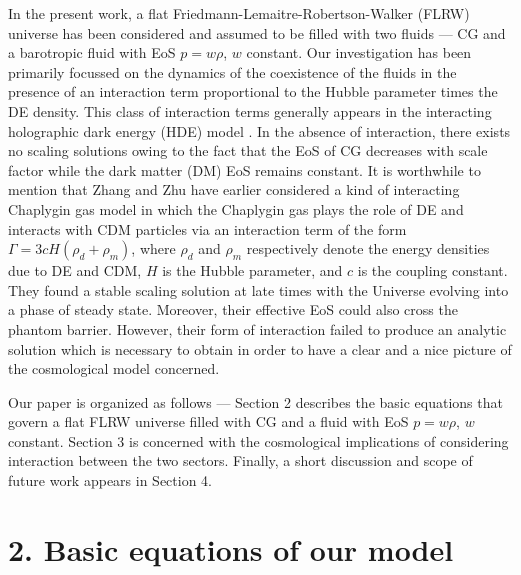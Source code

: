 \documentclass[two-column, nofootinbib]{revtex4-1}
\begin{document}
In the present work, a flat Friedmann-Lemaitre-Robertson-Walker (FLRW) universe has been considered and assumed to be filled with two fluids --- CG and a barotropic fluid with EoS $p=w\rho$, $w$ constant. Our investigation has been primarily focussed on the dynamics of the coexistence of the fluids %
in the presence of an interaction term proportional to the Hubble parameter times the DE density. %
This class of interaction terms generally appears in the interacting holographic dark energy (HDE) model \cite{Kim1,Wang1}. In the absence of interaction, there exists no scaling solutions owing to the fact that the EoS of CG decreases with scale factor while the dark matter (DM) EoS remains constant. It is worthwhile to mention that Zhang and Zhu \cite{Zhang1} have earlier considered a kind of interacting Chaplygin gas model in which the Chaplygin gas plays the role of DE and interacts with CDM particles via an interaction term of the form $\Gamma=3cH(\rho_d+\rho_m)$, where $\rho_d$ and $\rho_m$ respectively denote the energy densities due to DE and CDM, $H$ is the Hubble parameter, and $c$ is the coupling constant. They found a stable scaling solution at late times with the Universe evolving into a phase of steady state. Moreover, their effective EoS could also cross the phantom barrier. However, their form of interaction failed to produce an analytic solution which is necessary to obtain in order to have a clear and a nice picture of the cosmological model concerned.

Our paper is organized as follows --- Section 2 describes the basic equations that govern a flat FLRW universe filled with CG and a fluid with EoS $p=w\rho$, $w$ constant. %
Section 3 is concerned with the cosmological implications of considering interaction between the two sectors. Finally, a short discussion and scope of future work appears in Section 4.



\section*{2. Basic equations of our model}
\end{document}
